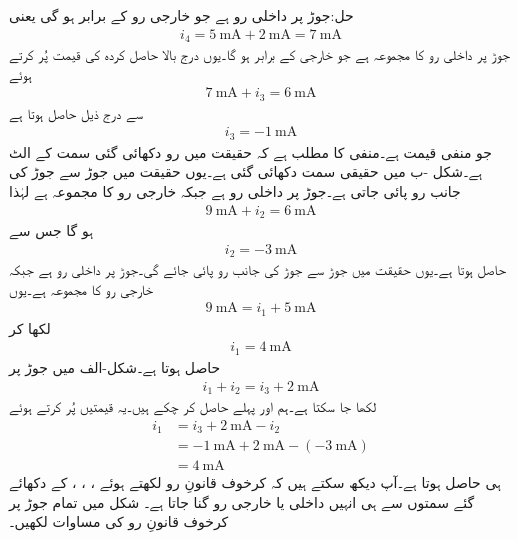 حل:جوڑ  پر داخلی رو  ہے جو خارجی رو  کے برابر ہو گی یعنی
\begin{align*}
i_4=\SI{5}{\milli\ampere}+\SI{2}{\milli\ampere}=\SI{7}{\milli\ampere}
\end{align*}
جوڑ  پر داخلی رو کا مجموعہ  ہے جو خارجی  کے برابر ہو گا۔یوں درج بالا حاصل کردہ  کی قیمت پُر کرتے ہوئے
\begin{align*}
\SI{7}{\milli\ampere}+i_3=\SI{6}{\milli\ampere}
\end{align*}
سے درج ذیل حاصل ہوتا ہے
\begin{align*}
i_3=\SI{-1}{\milli\ampere}
\end{align*}
جو منفی قیمت ہے۔منفی  کا مطلب ہے کہ حقیقت میں رو دکھائی گئی سمت کے الٹ ہے۔شکل -ب میں حقیقی سمت دکھائی گئی ہے۔یوں حقیقت میں جوڑ  سے جوڑ  کی جانب  رو پائی جاتی ہے۔جوڑ  پر داخلی رو  ہے جبکہ خارجی رو کا مجموعہ  ہے لہٰذا
\begin{align*}
\SI{9}{\milli\ampere}+i_2=\SI{6}{\milli\ampere}
\end{align*}
ہو گا جس سے
\begin{align*}
i_2=\SI{-3}{\milli\ampere}
\end{align*}
حاصل ہوتا ہے۔یوں حقیقت میں جوڑ  سے جوڑ  کی جانب  رو پائی جائے گی۔جوڑ  پر داخلی رو   ہے جبکہ خارجی رو کا مجموعہ  ہے۔یوں
\begin{align*}
\SI{9}{\milli\ampere}=i_1+\SI{5}{\milli\ampere}
\end{align*}
لکھا کر
\begin{align*}
i_1=\SI{4}{\milli\ampere}
\end{align*}
حاصل ہوتا ہے۔شکل-الف میں جوڑ  پر 
\begin{align*}
i_1+i_2=i_3+\SI{2}{\milli\ampere}
\end{align*}
لکھا جا سکتا ہے۔ہم  اور  پہلے حاصل کر چکے ہیں۔یہ قیمتیں پُر کرتے ہوئے
\begin{align*}
i_1&=i_3+\SI{2}{\milli\ampere}-i_2 \\
&=\SI{-1}{\milli\ampere}+\SI{2}{\milli\ampere}-(\SI{-3}{\milli\ampere}) \\
&=\SI{4}{\milli\ampere}
\end{align*}
ہی حاصل ہوتا ہے۔آپ دیکھ سکتے ہیں کہ کرخوف قانونِ رو لکھتے ہوئے ،  ، ،  کے دکھائے گئے سمتوں سے ہی انہیں داخلی یا خارجی رو گنا جاتا ہے۔
\FloatBarrier
شکل  میں تمام جوڑ پر کرخوف قانونِ رو کی مساوات لکھیں۔

